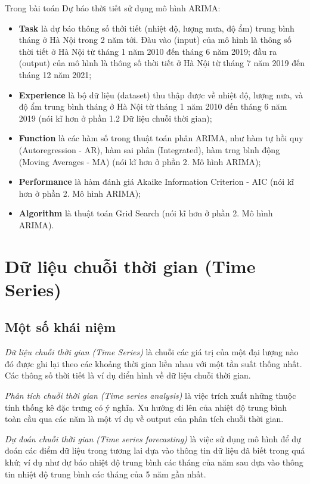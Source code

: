 \documentclass[12pt]{article}
\begin{document}
    Trong bài toán Dự báo thời tiết sử dụng mô hình ARIMA: \begin{itemize}
        \item \textbf{Task} là dự báo thông số thởi tiết (nhiệt độ, lượng mưa, độ ẩm) trung bình tháng ở Hà Nội trong 2 năm tới. Đàu vào (input) của mô hình là thông số thời tiết ở Hà Nội từ tháng 1 năm 2010 đến tháng 6 năm 2019; đầu ra (output) của mô hình là thông số thời tiết ở Hà Nội từ tháng 7 năm 2019 đến tháng 12 năm 2021;
        \item \textbf{Experience} là bộ dữ liệu (dataset) thu thập được về nhiệt độ, lượng nưa, và độ ẩm trung bình tháng ở Hà Nội từ tháng 1 năm 2010 đến tháng 6 năm 2019 (nói kĩ hơn ở phần 1.2 Dữ liệu chuỗi thời gian);
        \item \textbf{Function} là các hàm số trong thuật toán phân ARIMA, như hàm tự hồi quy (Autoregression - AR), hàm sai phân (Integrated), hàm trng bình động (Moving Averages - MA) (nói kĩ hơn ở phần 2. Mô hình ARIMA);
        \item \textbf{Performance} là hàm đánh giá Akaike Information Criterion - AIC (nói kĩ hơn ở phần 2. Mô hình ARIMA);
        \item \textbf{Algorithm} là thuật toán Grid Search (nói kĩ hơn ở phần 2. Mô hình ARIMA).
    \end{itemize}
        
\section{Dữ liệu chuỗi thời gian (Time Series)}

    \subsection{Một số khái niệm}
        
        \textit{Dữ liệu chuỗi thời gian (Time Series)} là chuỗi các giá trị của một đại lượng nào đó được ghi lại theo các khoảng thời gian liền nhau với một tần suất thống nhất. Các thông số thời tiết là ví dụ điển hình về dữ liệu chuỗi thời gian.
        
        \textit{Phân tích chuỗi thời gian (Time series analysis)} là việc trích xuất những thuộc tính thống kê đặc trưng có ý nghĩa. Xu hướng đi lên của nhiệt độ trung bình toàn cầu qua các năm là một ví dụ về output của phân tích chuỗi thời gian.
        
        \textit{Dự đoán chuỗi thời gian (Time series forecasting)} là việc sử dụng mô hình để dự đoán các điểm dữ liệu trong tương lai dựa vào thông tin dữ liệu đã biết trong quá khứ; ví dụ như  dự báo nhiệt độ trung bình các tháng của năm sau dựa vào thông tin nhiệt độ trung bình các tháng của 5 năm gần nhất.
        
\end{document}
